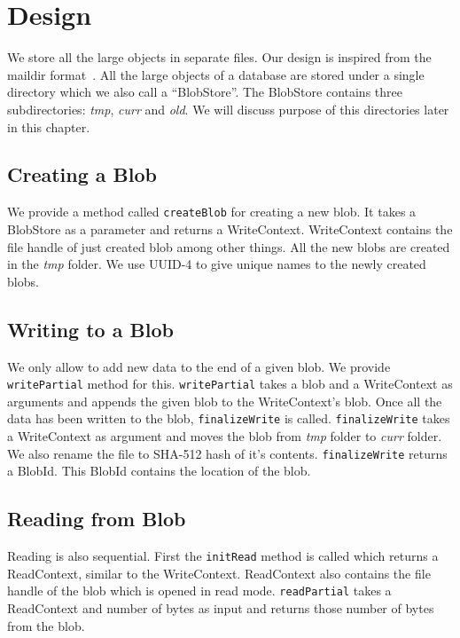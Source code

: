 \chapter{Design}
\label{chap:design}

We store all the large objects in separate files. Our design is inspired from the maildir format~\cite{bernstein1995using}. All the large objects of a database are stored under a single directory which we also call a ``BlobStore''.
The BlobStore contains three subdirectories: \textit{tmp}, \textit{curr} and \textit{old}. We will discuss purpose of this directories later in this chapter.

\section{Creating a Blob}
We provide a method called \texttt{createBlob} for creating a new blob. It takes a BlobStore as a parameter and returns a WriteContext. WriteContext contains the file handle of just created blob among other things. All the new blobs are created in the \textit{tmp} folder. We use UUID-4 to give unique names to the newly created blobs.

\section{Writing to a Blob}
We only allow to add new data to the end of a given blob. We provide \texttt{writePartial} method for this. \texttt{writePartial} takes a blob and a WriteContext as arguments and appends the given blob to the WriteContext's blob.
Once all the data has been written to the blob, \texttt{finalizeWrite} is called. \texttt{finalizeWrite} takes a WriteContext as argument and moves the blob from \textit{tmp} folder to \textit{curr} folder. We also rename the file to SHA-512 hash of it's contents.
\texttt{finalizeWrite} returns a BlobId. This BlobId contains the location of the blob.

\section{Reading from Blob}
Reading is also sequential. First the \texttt{initRead} method is called which returns a ReadContext, similar to the WriteContext. ReadContext also contains the file handle of the blob which is opened in read mode.
\texttt{readPartial} takes a ReadContext and number of bytes as input and returns those number of bytes from the blob.

